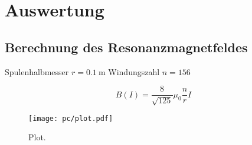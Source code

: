 \section{Auswertung}
\label{sec:Auswertung}
\subsection{Berechnung des Resonanzmagnetfeldes}

Spulenhalbmesser $r = \SI{0.1}{\meter}$
Windungszahl $n = 156$

\begin{equation}
    B(I)= \frac{8}{\sqrt{125}}\mu_0\frac{n}{r}I
\end{equation}

\begin{figure}
  \centering
  \texttt{[image: pc/plot.pdf]}
  \caption{Plot.}
  \label{fig:plot}
\end{figure}

